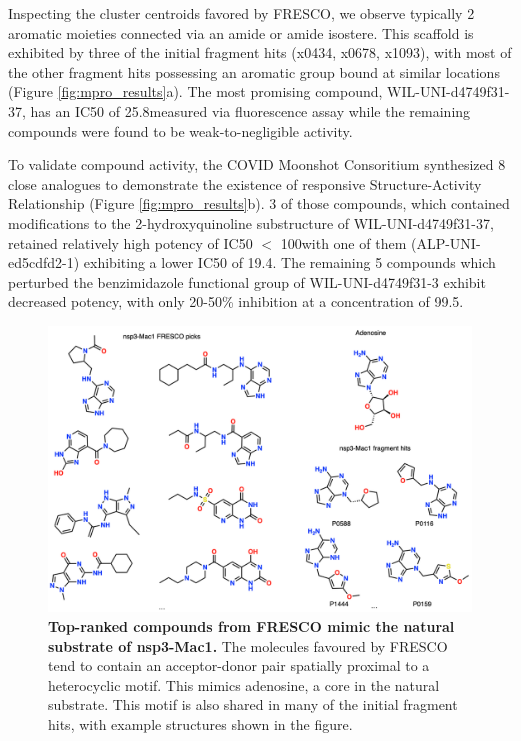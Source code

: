
Inspecting the cluster centroids favored by FRESCO, we observe typically 2 aromatic moieties connected via an amide or amide isostere. This scaffold is exhibited by three of the initial fragment hits (x0434, x0678, x1093), with most of the other fragment hits possessing an aromatic group bound at similar locations (Figure \ref{fig:mpro_results}a). The most promising compound, WIL-UNI-d4749f31-37, has an IC50 of 25.8\uM measured via fluorescence assay while the remaining compounds were found to be weak-to-negligible activity.

To validate compound activity, the COVID Moonshot Consoritium synthesized 8 close analogues to demonstrate the existence of responsive Structure-Activity Relationship \cite{Hermann2013ZincImpurity, Morreale2017ZincImpurity} (Figure \ref{fig:mpro_results}b). 3 of those compounds, which contained modifications to the 2-hydroxyquinoline substructure of WIL-UNI-d4749f31-37, retained relatively high potency of IC50 $<$ 100\uM with one of them (ALP-UNI-ed5cdfd2-1) exhibiting a lower IC50 of 19.4\uM. The remaining 5 compounds which perturbed the benzimidazole functional group of WIL-UNI-d4749f31-3 exhibit decreased potency, with only 20-50\% inhibition at a concentration of 99.5\uM.

\begin{figure}[!b]
    \centering
    \includegraphics[width=0.8\linewidth]{Chapters/Fresco/Figs/mac1_ligands.png}
    \caption{\textbf{Top-ranked compounds from FRESCO mimic the natural substrate of nsp3-Mac1.} The molecules favoured by FRESCO tend to contain an acceptor-donor pair spatially proximal to a heterocyclic motif. This mimics adenosine, a core in the natural substrate. This motif is also shared in many of the initial fragment hits, with example structures shown in the figure.}
    \label{fig:mac1_ligands}
   \end{figure}
   

